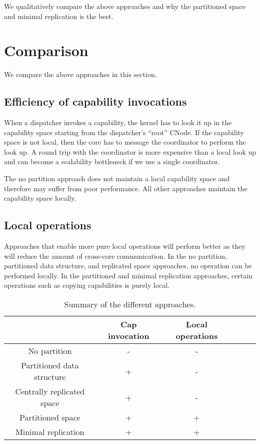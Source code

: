 \documentclass[a4paper,twoside]{report} %
\begin{document}
We qualitatively compare the above approaches and why the partitioned
space and minimal replication is the best.

\section{Comparison}\label{sec:comparison}
We compare the above approaches in this section.

\subsection{Efficiency of capability invocations}
When a dispatcher invokes a capability, the kernel has to look it up
in the capability space starting from the dispatcher's ``root'' CNode.
If the capability space is not local, then the core has to message the
coordinator to perform the look up. A round trip with the coordinator
is more expensive than a local look up and can become a scalability
bottleneck if we use a single coordinator.

The no partition approach does not maintain a local capability space
and therefore may suffer from poor performance. All other approaches
maintain the capability space locally.

\subsection{Local operations}
Approaches that enable more pure local operations will perform better
as they will reduce the amount of cross-core communication. In the no
partition, partitioned data structure, and replicated space
approaches, no operation can be performed locally. In the partitioned
and minimal replication approaches, certain operations such as copying
capabilities is purely local.

\begin{table*}
\begin{center}
\begin{tabular}{|c|c|c|c|c|c|}
  \hline

  & Cap invocation & Local operations \\
  \hline

  No partition                & - & -   \\ \hline
  Partitioned data structure  & + & -   \\ \hline
  Centrally replicated space  & + & -   \\ \hline
  Partitioned space           & + & +   \\ \hline
  Minimal replication         & + & +   \\ \hline

\end{tabular}
\end{center}
\caption{\label{t:summary}Summary of the different approaches.}
\end{table*}
\end{document}

